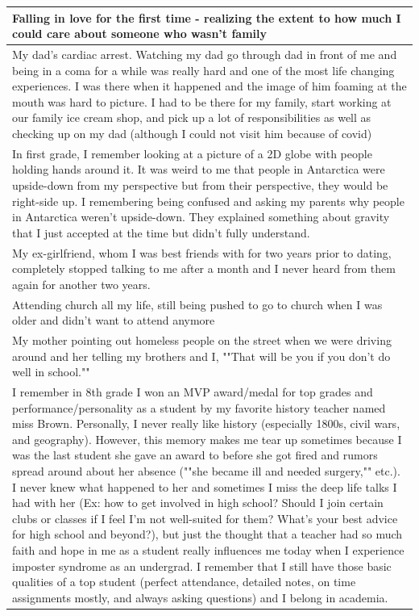 \documentclass[
  .7em,
  letterpaper,
  DIV=11,
  numbers=noendperiod]{scrartcl}
\begin{document}
\begin{table}
\begin{tabular}{l}
\hline
Falling in love for the first time - realizing the extent to how much I could care about someone who wasn't family\\
\hline
My dad's cardiac arrest. Watching my dad go through dad in front of me and being in a coma for a while was really hard and one of the most life changing experiences. I was there when it happened and the image of him foaming at the mouth was hard to picture. I had to be there for my family, start working at our family ice cream shop, and pick up a lot of responsibilities as well as checking up on my dad (although I could not visit him because of covid)\\
\hline
In first grade, I remember looking at a picture of a 2D globe with people holding hands around it. It was weird to me that people in Antarctica were upside-down from my perspective but from their perspective, they would be right-side up. I remembering being confused and asking my parents why people in Antarctica weren't upside-down. They explained something about gravity that I just accepted at the time but didn't fully understand.\\
\hline
My ex-girlfriend, whom I was best friends with for two years prior to dating, completely stopped talking to me after a month and I never heard from them again for another two years.\\
\hline
Attending church all my life, still being pushed to go to church when I was older and didn't want to attend anymore\\
\hline
My mother pointing out homeless people on the street when we were driving around and her telling my brothers and I, ""That will be you if you don't do well in school.""\\
\hline
I remember in 8th grade I won an MVP award/medal for top grades and performance/personality as a student by my favorite history teacher named miss Brown. Personally, I never really like history (especially 1800s, civil wars, and geography). However, this memory makes me tear up sometimes because I was the last student she gave an award to before she got fired and rumors spread around about her absence (""she became ill and needed surgery,"" etc.). I never knew what happened to her and sometimes I miss the deep life talks I had with her (Ex: how to get involved in high school? Should I join certain clubs or classes if I feel I'm not well-suited for them? What's your best advice for high school and beyond?), but just the thought that a teacher had so much faith and hope in me as a student really influences me today when I experience imposter syndrome as an undergrad. I remember that I still have those basic qualities of a top student (perfect attendance, detailed notes, on time assignments mostly, and always asking questions) and I belong in academia.\\

\end{tabular}
\end{table}
\end{document}
